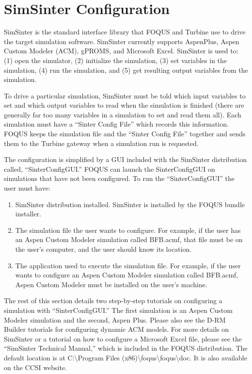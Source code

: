 \section{SimSinter Configuration}

SimSinter is the standard interface library that FOQUS and Turbine use
to drive the target simulation software. SimSinter currently supports
AspenPlus, Aspen Custom Modeler (ACM), gPROMS, and Microsoft Excel. SimSinter is used to: (1) open the simulator, (2) initialize the simulation, (3) set variables in the simulation, (4) run the simulation, and (5) get resulting output variables from the simulation.

To drive a particular simulation, SimSinter must be told which input variables to set and which output variables to read when the simulation is finished (there are generally far too many variables in a simulation to set and read them all). Each simulation must have a ``Sinter Config File'' which records this information. FOQUS keeps the simulation file and the ``Sinter Config File'' together and sends them to the Turbine gateway when a simulation run is requested.

The configuration is simplified by a GUI included with the SimSinter distribution called, ``SinterConfigGUI.'' FOQUS can launch the SinterConfigGUI on simulations that have not been configured. To run the ``SinterConfigGUI'' the user must have:
\begin{enumerate}
	\item	SimSinter distribution installed.  SimSinter is installed by the FOQUS bundle installer.
	\item   The simulation file the user wants to configure. For example, if the user has an Aspen Custom Modeler simulation called BFB.acmf, that file must be on the user's computer, and the user should know its location.
	\item   The application used to execute the simulation file. For example, if the user wants to configure an Aspen Custom Modeler simulation called BFB.acmf, Aspen Custom Modeler must be installed on the user's machine.	
\end{enumerate}
The rest of this section details two step-by-step tutorials on configuring a simulation with ``SinterConfigGUI.'' The first simulation is an Aspen Custom Modeler simulation and the second, Aspen Plus. Please also see the D-RM Builder tutorials for configuring dynamic ACM models.  For more details on SimSinter or a tutorial on how to configure a Microsoft Excel file, please see the ``SimSinter Technical Manual,''
which is included in the FOQUS distribution.  The default location is
at C:\textbackslash Program Files (x86)\textbackslash foqus\textbackslash foqus\textbackslash doc.  It is also available on the
CCSI website.  


